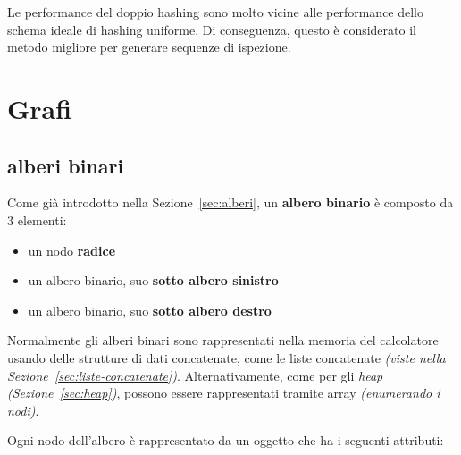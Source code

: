 \documentclass[italian, 10pt]{article}
\begin{document}
Le performance del doppio hashing sono molto vicine alle performance dello schema ideale di hashing uniforme.
Di conseguenza, questo è considerato il metodo migliore per generare sequenze di ispezione.

\clearpage

\section{Grafi}
\label{sec:grafi}

\subsection{alberi binari}

Come già introdotto nella Sezione~\ref{sec:alberi}, un \textbf{albero binario} è composto da \(3\) elementi:

\begin{itemize}
  \item un nodo \textbf{radice}
  \item un albero binario, suo \textbf{sotto albero sinistro}
  \item un albero binario, suo \textbf{sotto albero destro}
\end{itemize}

Normalmente gli alberi binari sono rappresentati nella memoria del calcolatore usando delle strutture di dati concatenate, come le liste concatenate \textit{(viste nella Sezione~\ref{sec:liste-concatenate})}.
Alternativamente, come per gli \textit{heap} \textit{(Sezione~\ref{sec:heap})}, possono essere rappresentati tramite array \textit{(enumerando i nodi)}.

Ogni nodo dell'albero è rappresentato da un oggetto che ha i seguenti attributi:
\end{document}
